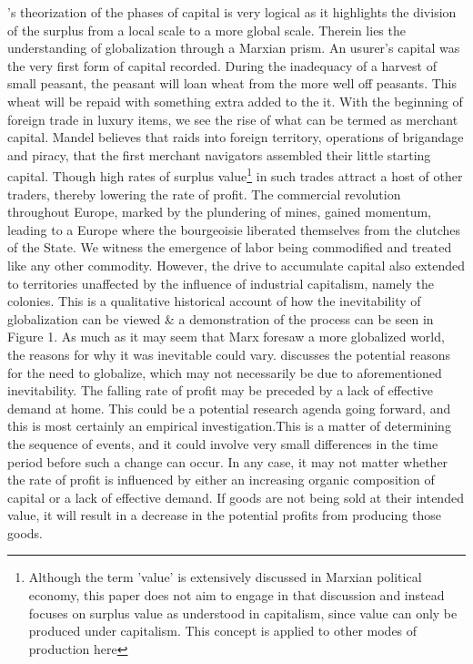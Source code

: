 \documentclass[10pt]{article}
\begin{document}
\par \citet{mandel1962marxist}'s theorization of the phases of capital is very logical as it highlights the division of the surplus from a local scale to a more global scale. Therein lies the understanding of globalization through a Marxian prism. An usurer's capital was the very first form of capital recorded. During the inadequacy of a harvest of small peasant, the peasant will loan wheat from the more well off peasants. This wheat will be repaid with something extra added to the it. With the beginning of foreign trade in luxury items, we see the rise of what can be termed as merchant capital. Mandel believes that raids into foreign territory, operations of brigandage and piracy, that the first merchant navigators assembled their little starting capital. Though high rates of surplus value\footnote{Although the term 'value' is extensively discussed in Marxian political economy, this paper does not aim to engage in that discussion and instead focuses on surplus value as understood in capitalism, since value can only be produced under capitalism. This concept is applied to other modes of production here} in such trades attract a host of other traders, thereby lowering the rate of profit. The commercial revolution throughout Europe, marked by the plundering of mines, gained momentum, leading to a Europe where the bourgeoisie liberated themselves from the clutches of the State. We witness the emergence of labor being commodified and treated like any other commodity. However, the drive to accumulate capital also extended to territories unaffected by the influence of industrial capitalism, namely the colonies. This is a qualitative historical account of how the inevitability of globalization can be viewed \& a demonstration of the process can be seen in Figure 1. As much as it may seem that Marx foresaw a more globalized world, the reasons for why it was inevitable could vary. \citet{ramirez2012falling} discusses the potential reasons for the need to globalize, which may not necessarily be due to aforementioned inevitability. The falling rate of profit may be preceded by a lack of effective demand at home. This could be a potential research agenda going forward, and this is most certainly an empirical investigation.This is a matter of determining the sequence of events, and it could involve very small differences in the time period before such a change can occur. In any case, it may not matter whether the rate of profit is influenced by either an increasing organic composition of capital or a lack of effective demand. If goods are not being sold at their intended value, it will result in a decrease in the potential profits from producing those goods.
\end{document}
